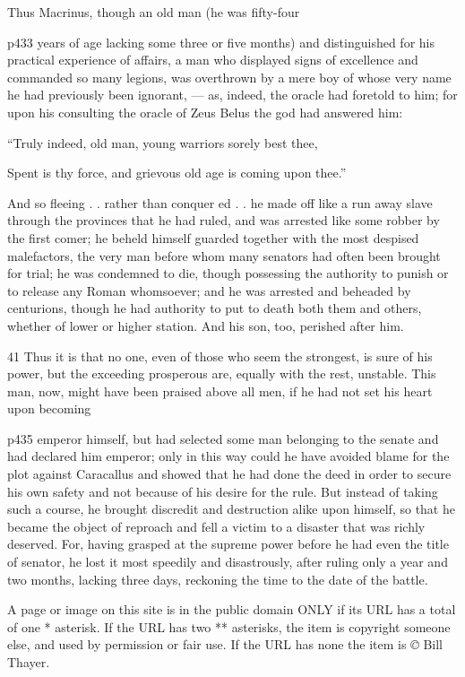 Thus Macrinus, though an old man (he was fifty-four

p433 years of age lacking some three or five months) and distinguished for his practical experience of affairs, a man who displayed signs of excellence and commanded so many legions, was overthrown by a mere boy of whose very name he had previously been ignorant, \texthebrew{—} as, indeed, the oracle had foretold to him; for upon his consulting the oracle of Zeus Belus the god had answered him:

``Truly indeed, old man, young warriors sorely best thee,

Spent is thy force, and grievous old age is coming upon thee.''

And so fleeing . . rather than conquer ed . . he made off like a run away slave through the provinces that he had ruled, and was arrested like some robber by the first comer; he beheld himself guarded together with the most despised malefactors, the very man before whom many senators had often been brought for trial; he was condemned to die, though possessing the authority to punish or to release any Roman whomsoever; and he was arrested and beheaded by centurions, though he had authority to put to death both them and others, whether of lower or higher station. And his son, too, perished after him.

41
Thus it is that no one, even of those who seem the strongest, is sure of his power, but the exceeding prosperous are, equally with the rest, unstable. This man, now, might have been praised above all men, if he had not set his heart upon becoming

p435 emperor himself, but had selected some man belonging to the senate and had declared him emperor; only in this way could he have avoided blame for the plot against Caracallus and showed that he had done the deed in order to secure his own safety and not because of his desire for the rule. But instead of taking such a course, he brought discredit and destruction alike upon himself, so that he became the object of reproach and fell a victim to a disaster that was richly deserved. For, having grasped at the supreme power before he had even the title of senator, he lost it most speedily and disastrously, after ruling only a year and two months, lacking three days, reckoning the time to the date of the battle.

A page or image on this site is in the public domain ONLY if its URL has a total of one * asterisk. If the URL has two ** asterisks, the item is copyright someone else, and used by permission or fair use. If the URL has none the item is \emph{©} Bill Thayer.

